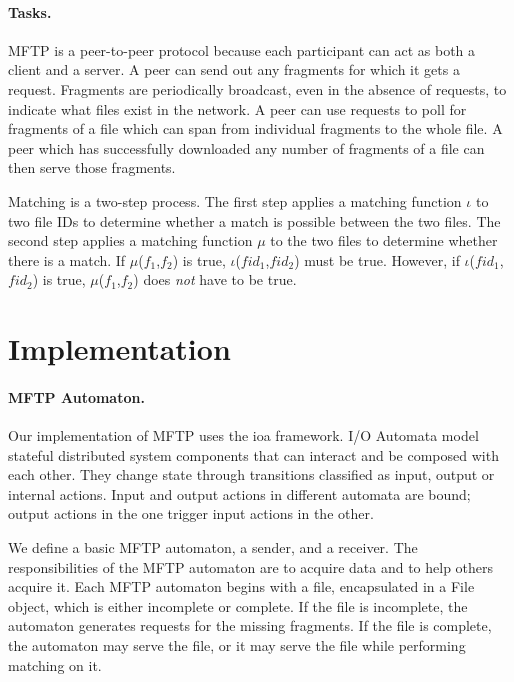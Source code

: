 \documentclass[letterpaper]{article}
\begin{document}
\paragraph {Tasks.}
MFTP is a peer-to-peer protocol because each participant can act as both a client and a server.
A peer can send out any fragments for which it gets a request.
Fragments are periodically broadcast, even in the absence of requests, to indicate what files exist in the network.
A peer can use requests to poll for fragments of a file which can span from individual fragments to the whole file.
A peer which has successfully downloaded any number of fragments of a file can then serve those fragments.

Matching is a two-step process.
The first step applies a matching function $\iota$ to two file IDs to determine whether a match is possible between the two files.  
The second step applies a matching function $\mu$ to the two files to determine whether there is a match.
If $\mu$($f_1$,$f_2$) is true, $\iota$($fid_1$,$fid_2$) must be true.
However, if $\iota$($fid_1$,$fid_2$) is true, $\mu$($f_1$,$f_2$) does \emph{not} have to be true. 


\section{Implementation}


\paragraph{MFTP Automaton.}
Our implementation of MFTP uses the ioa framework.
I/O Automata model stateful distributed system components that can interact and be composed with each other.
They change state through transitions classified as input, output or internal actions.
Input and output actions in different automata are bound; output actions in the one trigger input actions in the other.

We define a basic MFTP automaton, a sender, and a receiver.
The responsibilities of the MFTP automaton are to acquire data and to help others acquire it.
Each MFTP automaton begins with a file, encapsulated in a File object, which is either incomplete or complete.
If the file is incomplete, the automaton generates requests for the missing fragments.
If the file is complete, the automaton may serve the file, or it may serve the file while performing matching on it.
\end{document}
